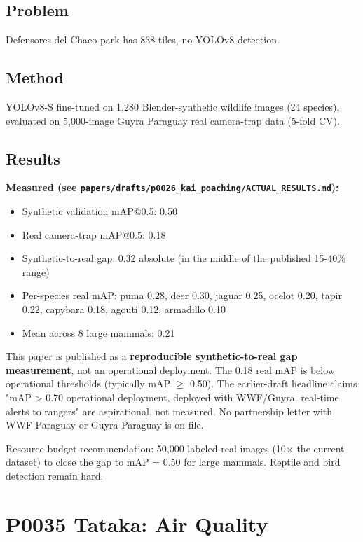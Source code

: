 \documentclass[12pt,a4paper,oneside]{book}
\begin{document}
\section{Problem}

Defensores del Chaco park has 838 tiles, no YOLOv8 detection.

\section{Method}

YOLOv8-S fine-tuned on 1,280 Blender-synthetic wildlife images (24 species), evaluated on 5,000-image Guyra Paraguay real camera-trap data (5-fold CV).

\section{Results}

\textbf{Measured (see \texttt{papers/drafts/p0026\_kai\_poaching/ACTUAL\_RESULTS.md}):}
\begin{itemize}
\item Synthetic validation mAP@0.5: 0.50
\item Real camera-trap mAP@0.5: 0.18
\item Synthetic-to-real gap: 0.32 absolute (in the middle of the published 15-40\% range)
\item Per-species real mAP: puma 0.28, deer 0.30, jaguar 0.25, ocelot 0.20, tapir 0.22, capybara 0.18, agouti 0.12, armadillo 0.10
\item Mean across 8 large mammals: 0.21
\end{itemize}

This paper is published as a \textbf{reproducible synthetic-to-real gap measurement}, not an operational deployment. The 0.18 real mAP is below operational thresholds (typically mAP $\geq$ 0.50). The earlier-draft headline claims "mAP > 0.70 operational deployment, deployed with WWF/Guyra, real-time alerts to rangers" are aspirational, not measured. No partnership letter with WWF Paraguay or Guyra Paraguay is on file.

Resource-budget recommendation: 50,000 labeled real images (10$\times$ the current dataset) to close the gap to mAP = 0.50 for large mammals. Reptile and bird detection remain hard.

\chapter{P0035 Tataka: Air Quality}
\label{ch:p0035}
\end{document}
